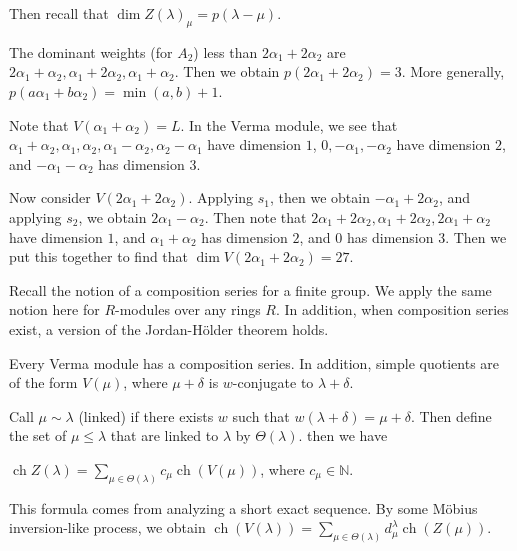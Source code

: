 \documentclass[twoside, 10pt]{article}
\begin{document}
    Then recall that $\dim Z(\lambda)_{\mu} = p(\lambda - \mu)$.

    \begin{exm}
        The dominant weights (for $A_2$) less than $2 \alpha_1 + 2 \alpha_2$ are $2 \alpha_1 + \alpha_2, \alpha_1 + 2 \alpha_2, \alpha_1 + \alpha_2$. Then we obtain $p(2 \alpha_1 + 2 \alpha_2) = 3$. More generally, $p(a\alpha_1 + b \alpha_2) = \min(a,b) + 1$.
    \end{exm}

    \begin{exm}
        Note that $V(\alpha_1 + \alpha_2) = L$. In the Verma module, we see that $\alpha_1 + \alpha_2, \alpha_1, \alpha_2, \alpha_1 - \alpha_2, \alpha_2 - \alpha_1$ have dimension $1$, $0, -\alpha_1, -\alpha_2$ have dimension $2$, and $-\alpha_1 - \alpha_2$ has dimension $3$.
    \end{exm}

    Now consider $V(2\alpha_1 + 2 \alpha_2)$. Applying $s_1$, then we obtain $-\alpha_1 + 2 \alpha_2$, and applying $s_2$, we obtain $2 \alpha_1 - \alpha_2$. Then note that $2 \alpha_1 + 2 \alpha_2, \alpha_1 + 2 \alpha_2, 2 \alpha_1 + \alpha_2$ have dimension $1$, and $\alpha_1 + \alpha_2$ has dimension $2$, and $0$ has dimension $3$. Then we put this together to find that $\dim V(2 \alpha_1 + 2 \alpha_2) = 27$.

    Recall the notion of a composition series for a finite group. We apply the same notion here for $R$-modules over any rings $R$. In addition, when composition series exist, a version of the Jordan-H\"older theorem holds.

    \begin{thm}
        Every Verma module has a composition series. In addition, simple quotients are of the form $V(\mu)$, where $\mu + \delta$ is $w$-conjugate to $\lambda + \delta$.
    \end{thm}

    Call $\mu \sim \lambda$ (linked) if there exists $w$ such that $w(\lambda + \delta) = \mu + \delta$. Then define the set of $\mu \leq \lambda$ that are linked to $\lambda$ by $\Theta(\lambda)$. then we have
    \begin{cor}
        $\operatorname{ch} Z(\lambda) = \sum_{\mu \in \Theta(\lambda)} c_{\mu} \operatorname{ch}(V(\mu))$, where $c_{\mu} \in \mathbb{N}$.
    \end{cor}
    This formula comes from analyzing a short exact sequence. By some M\"obius inversion-like process, we obtain $\operatorname{ch}(V(\lambda)) = \sum_{\mu \in \Theta(\lambda)} d_{\mu}^{\lambda} \operatorname{ch}(Z(\mu))$.
\end{document}
